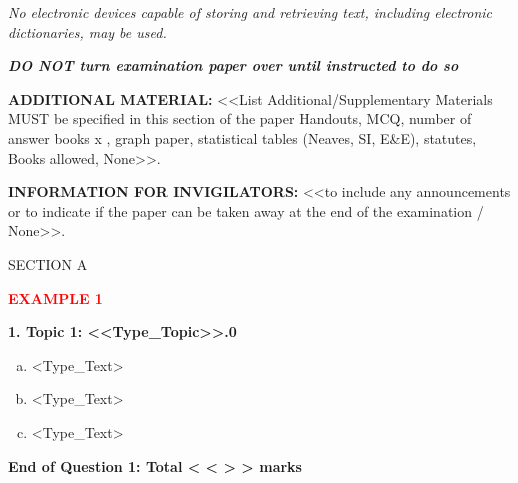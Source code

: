 \documentclass[11pt,a4paper,twoside]{article}
\begin{document}
\begin{center}\textit{No electronic devices capable of storing and retrieving text, including electronic dictionaries, may be used.}
\end{center}

\begin{center}\textbf{\textit{DO NOT turn examination paper over 
until instructed to do so}}\end{center}

\noindent\textbf{ADDITIONAL MATERIAL: }<<List Additional/Supplementary Materials MUST be specified in this section of the paper {Handouts, MCQ, number of answer books x , graph paper, statistical tables (Neaves, SI, E\&E), statutes, Books allowed, None}>>. 


\noindent\textbf{INFORMATION FOR INVIGILATORS: }<<to include any announcements or to indicate if the paper can be taken away at the end of the examination / None>>.



\newpage
\begin{center} SECTION A\end{center}

\noindent \textcolor{red}{\textbf{EXAMPLE 1}}

\noindent\textbf{1. Topic 1: <<Type\_Topic>>.0}

\begin{enumerate}[a. ]
\item <Type\_Text> 
\begin{flushright}[< < > > Marks]\end{flushright}
\item <Type\_Text> 
\begin{flushright}[< < > > Marks]\end{flushright}
\item <Type\_Text> 
\begin{flushright}[< < > > Marks]\end{flushright}
\end{enumerate}
\begin{flushright}\textbf{End of Question 1: Total < < > > marks}\end{flushright}
\end{document}
